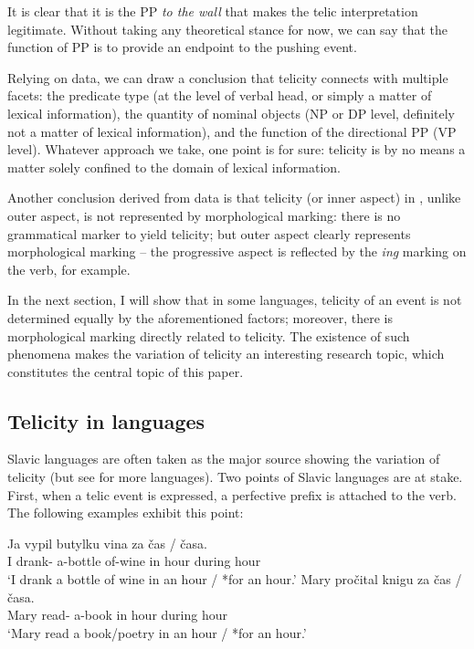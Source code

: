 \documentclass[output=paper]{langsci/langscibook}
\begin{document}
It is clear that it is the PP \emph{to the wall} that makes the telic
interpretation legitimate. Without taking any theoretical stance for now, we
can say that the function of PP is to provide an endpoint to the pushing event.

Relying on  data, we can draw a conclusion that telicity connects with
multiple facets: the predicate type (at the level of verbal head, or simply a
matter of lexical information), the quantity of nominal objects (NP or DP
level, definitely not a matter of lexical information), and the function of
the directional PP (VP level). Whatever approach we take, one point is for
sure: telicity is by no means a matter solely confined to the domain of lexical
information.

Another conclusion derived from  data is that telicity (or inner aspect)
in , unlike outer aspect, is not represented by morphological marking:
there is no grammatical marker to yield telicity; but outer aspect clearly
represents morphological marking -- the progressive aspect is reflected by the
\emph{ing} marking on the verb, for example.

In the next section, I will show that in some languages, telicity of an event
is not determined equally by the aforementioned factors; moreover, there is
morphological marking directly related to telicity. The existence of such
phenomena makes the variation of telicity an interesting research topic, which
constitutes the central topic of this paper.

\subsection{Telicity in  languages}\label{sub:17.2.2}

Slavic languages are often taken as the major source showing the variation of
telicity (but see \citealt{travis2010inner} for more languages). Two points of
Slavic languages are at stake. First, when a telic event is expressed, a
perfective prefix is attached to the verb. The following  examples
exhibit this point:

\begin{exe}
\ex {} \parencite[146]{MacDonald2008}\begin{xlist}
    \ex \gll Ja vypil butylku vina za čas {/ }  časa.\\
            I {drank-\Pfv{}} a-bottle of-wine in hour {} during hour \\
	    \glt \enquote*{I drank a bottle of wine in an hour / *for an hour.}
    \ex \gll  Mary pročital knigu za čas {/ }  časa.\\
            Mary {read-\Pfv{}} a-book in hour {} during hour\\
        \glt \enquote*{Mary read a book/poetry in an hour / *for an hour.}
\end{xlist}
\end{exe}
\end{document}
